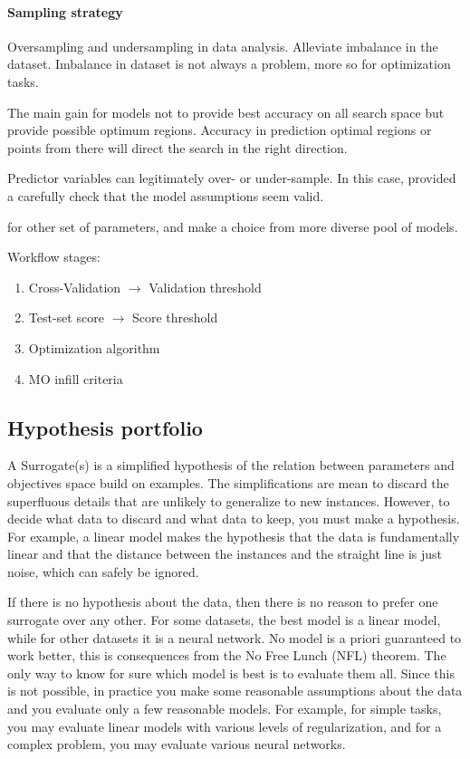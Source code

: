     \paragraph{Sampling strategy} Oversampling and undersampling in data analysis. Alleviate imbalance in the dataset. 
    Imbalance in dataset is not always a problem, more so for optimization tasks. 

    The main gain for models not to provide best accuracy on all search space but provide possible optimum regions.
    Accuracy in prediction optimal regions or points from there will direct the search in the right direction.

    Predictor variables can legitimately over- or under-sample. 
    In this case, provided a carefully check that the model assumptions seem valid.

    for other set of parameters, and make a choice from more diverse pool of models.

    Workflow stages:
    \begin{enumerate}
        \item Cross-Validation $\rightarrow$ Validation threshold
        \item Test-set score $\rightarrow$ Score threshold
        \item Optimization algorithm
        \item MO infill criteria
    \end{enumerate}


    \subsection{Hypothesis portfolio}
    A Surrogate(s) is a simplified hypothesis of the relation between parameters and objectives space build on examples. The simplifications are mean to discard the superfluous details that are unlikely to generalize to new instances. However, to decide what data to discard and what data to keep, you must make a hypothesis. For example, a linear model makes the hypothesis that the data is fundamentally linear and that the distance between the instances and the straight line is just noise, which can safely be ignored.

    If there is no hypothesis about the data, then there is no reason to prefer one surrogate over any other.  For some datasets, the best model is a linear model, while for other datasets it is a neural network. No model is a priori guaranteed to work better, this is consequences from the No Free Lunch (NFL) theorem. The only way to know for sure which model is best is to evaluate them all. Since this is not possible, in practice you make some reasonable assumptions about the data and you evaluate only a few reasonable models. For example, for simple tasks, you may evaluate linear models with various levels of regularization, and for a complex problem, you may evaluate various neural networks.

